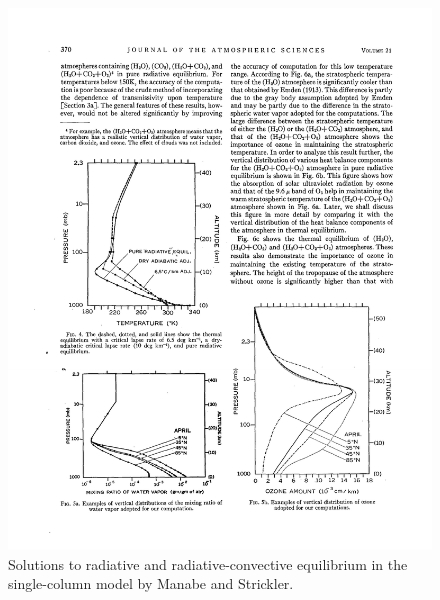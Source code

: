\documentclass[12pt]{book}
\begin{document}
\begin{figure}
\begin{center}
\includegraphics[width=10 cm]{../external_figures/Manabe_Strickler_1964_figure.pdf}
\end{center}
\caption{ Solutions to radiative and radiative-convective equilibrium in the single-column model by Manabe and Strickler\citep{Manabe1964}.   } 
\label{fig:rce_manabe}
\end{figure}
\end{document}
